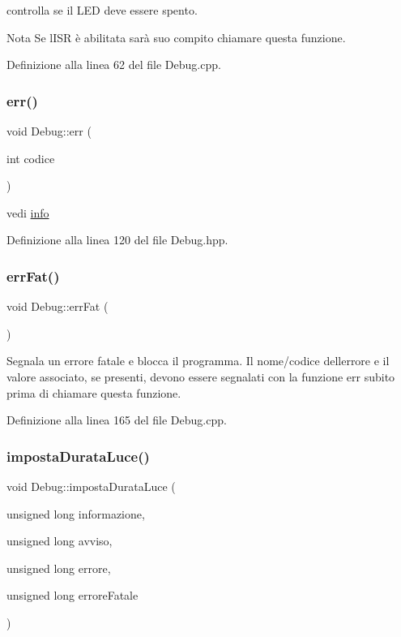 controlla se il L\+ED deve essere spento. \begin{DoxyNote}{Nota}
Se l\textquotesingle{}I\+SR è abilitata sarà suo compito chiamare questa funzione. 
\end{DoxyNote}


Definizione alla linea 62 del file Debug.\+cpp.

\mbox{\label{class_debug_a8937e0f08ba09157f0d6660b2a0a02f1}} 
\subsubsection{\texorpdfstring{err()}{err()}}
{\footnotesize\ttfamily void Debug\+::err (\begin{DoxyParamCaption}\item[{int}]{codice }\end{DoxyParamCaption})\hspace{0.3cm}{\ttfamily [inline]}}

vedi \hyperlink{class_debug_a9e8eec71718abfd7cca293c81bbd3409}{info} 

Definizione alla linea 120 del file Debug.\+hpp.

\mbox{\label{class_debug_abe97a56741964a962add2db1e82731ad}} 
\subsubsection{\texorpdfstring{err\+Fat()}{errFat()}}
{\footnotesize\ttfamily void Debug\+::err\+Fat (\begin{DoxyParamCaption}{ }\end{DoxyParamCaption})}

Segnala un errore fatale e blocca il programma. Il nome/codice dell\textquotesingle{}errore e il valore associato, se presenti, devono essere segnalati con la funzione {\ttfamily err} subito prima di chiamare questa funzione. 

Definizione alla linea 165 del file Debug.\+cpp.

\mbox{\label{class_debug_a65bc65d905d75d0ca765d81132f563c1}} 
\subsubsection{\texorpdfstring{imposta\+Durata\+Luce()}{impostaDurataLuce()}}
{\footnotesize\ttfamily void Debug\+::imposta\+Durata\+Luce (\begin{DoxyParamCaption}\item[{unsigned long}]{informazione,  }\item[{unsigned long}]{avviso,  }\item[{unsigned long}]{errore,  }\item[{unsigned long}]{errore\+Fatale }\end{DoxyParamCaption})}

